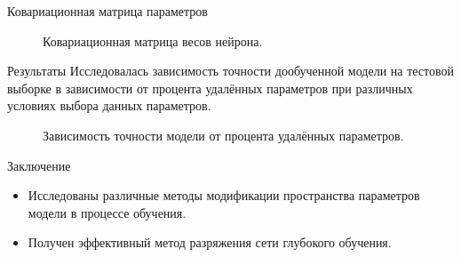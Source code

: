 \documentclass[10pt,pdf,russian]{beamer}
\begin{document}
\begin{frame}{Ковариационная матрица параметров}
\begin{figure}[h]
\noindent{}
\caption{Ковариационная матрица весов нейрона.}
\label{fig_time_acc}
\end{figure}
\end{frame}


\begin{frame}{Результаты}
Исследовалась зависимость точности дообученной модели на тестовой выборке в зависимости от процента удалённых параметров при различных условиях выбора данных параметров.
\begin{figure}[h]
\noindent{}
\caption{Зависимость точности модели от процента удалённых параметров.}
\label{fig_time_acc}
\end{figure}
\end{frame}

\begin{frame}{Заключение}
\begin{itemize}
\item Исследованы различные методы модификации пространства параметров модели в процессе обучения.
\item Получен эффективный метод разряжения сети глубокого обучения.
\end{itemize}
\end{frame}
\end{document}
